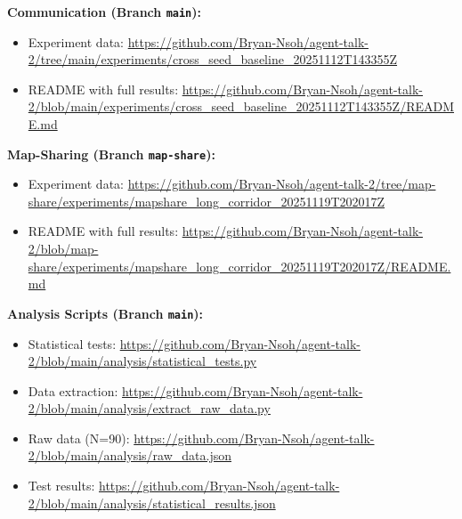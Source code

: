 \documentclass[11pt]{article}
\begin{document}
\textbf{Communication (Branch \texttt{main}):}
\begin{itemize}
    \item Experiment data: \url{https://github.com/Bryan-Nsoh/agent-talk-2/tree/main/experiments/cross_seed_baseline_20251112T143355Z}
    \item README with full results: \url{https://github.com/Bryan-Nsoh/agent-talk-2/blob/main/experiments/cross_seed_baseline_20251112T143355Z/README.md}
\end{itemize}

\textbf{Map-Sharing (Branch \texttt{map-share}):}
\begin{itemize}
    \item Experiment data: \url{https://github.com/Bryan-Nsoh/agent-talk-2/tree/map-share/experiments/mapshare_long_corridor_20251119T202017Z}
    \item README with full results: \url{https://github.com/Bryan-Nsoh/agent-talk-2/blob/map-share/experiments/mapshare_long_corridor_20251119T202017Z/README.md}
\end{itemize}

\textbf{Analysis Scripts (Branch \texttt{main}):}
\begin{itemize}
    \item Statistical tests: \url{https://github.com/Bryan-Nsoh/agent-talk-2/blob/main/analysis/statistical_tests.py}
    \item Data extraction: \url{https://github.com/Bryan-Nsoh/agent-talk-2/blob/main/analysis/extract_raw_data.py}
    \item Raw data (N=90): \url{https://github.com/Bryan-Nsoh/agent-talk-2/blob/main/analysis/raw_data.json}
    \item Test results: \url{https://github.com/Bryan-Nsoh/agent-talk-2/blob/main/analysis/statistical_results.json}
\end{itemize}
\end{document}
